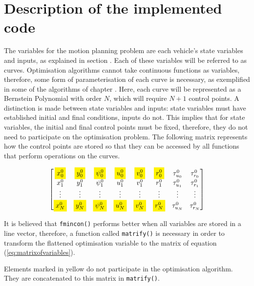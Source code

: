 \section{Description of the implemented code}
\label{sec:description_implementation}

\par The variables for the motion planning problem are each vehicle's state variables and inputs, as explained in section \label{sec:theoptproblem}. Each of these variables will be referred to as curves. Optimisation algorithms cannot take continuous functions as variables, therefore, some form of parameterisation of each curve is necessary, as exemplified in some of the algorithms of chapter \label{chap:theory}. Here, each curve will be represented as a Bernstein Polynomial with order $N$, which will require $N+1$ control points. A distinction is made between state variables and inputs: state variables must have established initial and final conditions, inputs do not. This implies that for state variables, the initial and final control points must be fixed, therefore, they do not need to participate on the optimisation problem. The following matrix represents how the control points are stored so that they can be accessed by all functions that perform operations on the curves.

\begin{equation}
    \begin{bmatrix}
        \colorbox{yellow}{$\displaystyle x_0^0$} & \colorbox{yellow}{$\displaystyle y_0^0$} & \colorbox{yellow}{$\displaystyle \psi_0^0$} & \colorbox{yellow}{$\displaystyle u_0^0$} & \colorbox{yellow}{$\displaystyle v_0^0$} & \colorbox{yellow}{$\displaystyle r_0^0$} & \tau_{u_0}^0 & \tau_{r_0}^0 \\
        x_1^0 & y_1^0 & \psi_1^0 & u_1^0 & v_1^0 & r_1^0 & \tau_{u_1}^0 & \tau_{r_1}^0 \\
        \vdots & \vdots & \vdots & \vdots & \vdots & \vdots & \vdots & \vdots \\
        \colorbox{yellow}{$x_{N}^0$} & \colorbox{yellow}{$y_{N}^0$} & \colorbox{yellow}{$\psi_{N}^0$} & \colorbox{yellow}{$u_{N}^0$} & \colorbox{yellow}{$v_{N}^0$} & \colorbox{yellow}{$r_{N}^0$} & \tau_{u_{N}}^0 & \tau_{r_{N}}^0
    \end{bmatrix}
    \label{eq:matrixofvariables}
\end{equation}

\par It is believed  that \texttt{fmincon()} performs better when all variables are stored in a line vector, therefore, a function called \texttt{matrify()} is necessary in order to transform the flattened optimisation variable to the matrix of equation (\ref{eq:matrixofvariables}). 
\par Elements marked in yellow do not participate in the optimisation algorithm. They are concatenated to this matrix in \texttt{matrify()}. 

